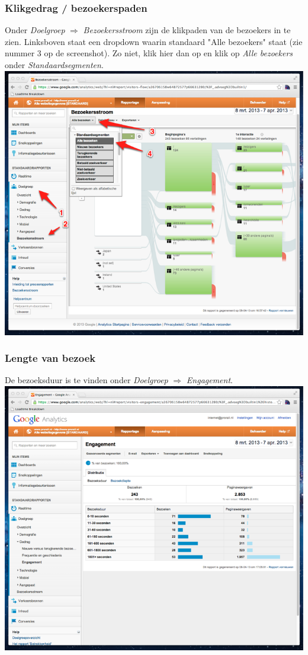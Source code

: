 \clearpage
\subsubsection{Klikgedrag / bezoekerspaden}
Onder \emph{Doelgroep} $\Rightarrow$ \emph{Bezoekersstroom} zijn de klikpaden van de bezoekers in te zien. Linksboven staat een dropdown waarin standaard "Alle bezoekers" staat (zie nummer 3 op de screenshot). Zo niet, klik hier dan op en klik op \emph{Alle bezoekers} onder \emph{Standaardsegmenten}.
\\

\includegraphics[width=\textwidth]{img/stats3.png}

\clearpage
\subsubsection{Lengte van bezoek}
De bezoeksduur is te vinden onder \emph{Doelgroep} $\Rightarrow$ \emph{Engagement}.
\\

\includegraphics[width=\textwidth]{img/stats4.png}

